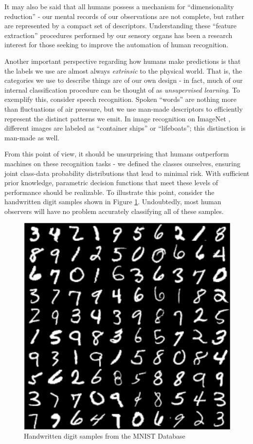 \documentclass[12pt]{report}
\begin{document}
It may also be said that all humans possess a mechanism for ``dimensionality reduction'' - our mental records of our observations are not complete, but rather are represented by a compact set of descriptors. Understanding these ``feature extraction'' procedures performed by our sensory organs has been a research interest for those seeking to improve the automation of human recognition. 


Another important perspective regarding how humans make predictions is that the labels we use are almost always \emph{extrinsic} to the physical world. That is, the categories we use to describe things are of our own design - in fact, much of our internal classification procedure can be thought of as \emph{unsupervised learning}. To exemplify this, consider speech recognition. Spoken ``words'' are nothing more than fluctuations of air pressure, but we use man-made descriptors to efficiently represent the distinct patterns we emit. In image recognition on ImageNet \cite{krizhevsky}, different images are labeled as ``container ships'' or ``lifeboats''; this distinction is man-made as well.

From this point of view, it should be unsurprising that humans outperform machines on these recognition tasks - we defined the classes ourselves, ensuring joint class-data probability distributions that lead to minimal risk. With sufficient prior knowledge, parametric decision functions that meet these levels of performance should be realizable. To illustrate this point, consider the handwritten digit samples \cite{lecun-mnist} shown in Figure \ref{fig:mnist_digit_ex}. Undoubtedly, most human observers will have no problem accurately classifying all of these samples. 
\begin{figure}
\centering
\includegraphics[width=0.5\linewidth]{mnist_digit_ex.png}
\caption{Handwritten digit samples from the MNIST Database}
\label{fig:mnist_digit_ex}
\end{figure}
\end{document}
